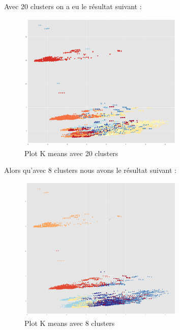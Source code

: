 \documentclass[12pt]{article}
\begin{document}
{Avec 20 clusters on a eu le résultat suivant :


\begin{figure}[H]
	\centering
    \includegraphics[width=0.7\textwidth]{image35.png}
     \caption{ Plot K means avec 20 clusters}
    \label{fig:35}
\end{figure}


Alors qu’avec 8 clusters nous avons le résultat suivant :


\begin{figure}[H]
	\centering
    \includegraphics[width=0.7\textwidth]{image36.png}
     \caption{ Plot K means avec 8 clusters}
    \label{fig:36}
\end{figure}


}
\end{document}
